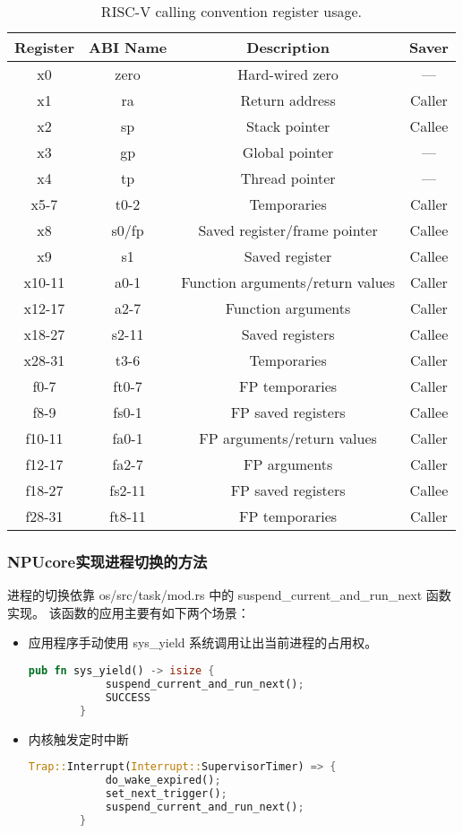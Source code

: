 \begin{table}[h]
	\centering
	\begin{tabular}{|c|c|c|c|}
		\hline
		\textbf{Register} & \textbf{ABI Name} & \textbf{Description} & \textbf{Saver} \\
		\hline
		x0 & zero & Hard-wired zero & --- \\
		x1 & ra & Return address & Caller \\
		x2 & sp & Stack pointer & Callee \\
		x3 & gp & Global pointer & --- \\
		x4 & tp & Thread pointer & --- \\
		x5-7 & t0-2 & Temporaries & Caller \\
		x8 & s0/fp & Saved register/frame pointer & Callee \\
		x9 & s1 & Saved register & Callee \\
		x10-11 & a0-1 & Function arguments/return values & Caller \\
		x12-17 & a2-7 & Function arguments & Caller \\
		x18-27 & s2-11 & Saved registers & Callee \\
		x28-31 & t3-6 & Temporaries & Caller \\
		f0-7 & ft0-7 & FP temporaries & Caller \\
		f8-9 & fs0-1 & FP saved registers & Callee \\
		f10-11 & fa0-1 & FP arguments/return values & Caller \\
		f12-17 & fa2-7 & FP arguments & Caller \\
		f18-27 & fs2-11 & FP saved registers & Callee \\
		f28-31 & ft8-11 & FP temporaries & Caller \\
		\hline
	\end{tabular}
	\caption{RISC-V calling convention register usage.}
\end{table}

\newpage

\subsubsection{NPUcore实现进程切换的方法}
进程的切换依靠 os/src/task/mod.rs 中的 suspend\_current\_and\_run\_next 函数实现。
该函数的应用主要有如下两个场景：
\begin{itemize}
	\item{应用程序手动使用 sys\_yield 系统调用让出当前进程的占用权。}
	\begin{lstlisting}[language={Rust}, label={code:syscall yield},caption={syscall yield}]
		pub fn sys_yield() -> isize {
			suspend_current_and_run_next();
			SUCCESS
		}
	\end{lstlisting}
	\item{内核触发定时中断}
	\begin{lstlisting}[language={Rust}, label={code:Timer Interrupt},caption={Timer Interrupt}]
		Trap::Interrupt(Interrupt::SupervisorTimer) => {
			do_wake_expired();
			set_next_trigger();
			suspend_current_and_run_next();
		}
	\end{lstlisting}
\end{itemize}

